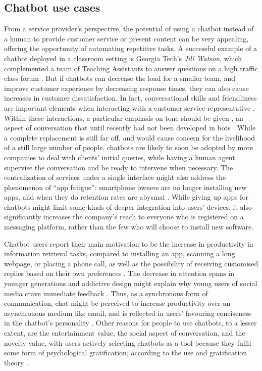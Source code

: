 \subsection{Chatbot use cases}
From a service provider's perspective, the potential of using a chatbot instead of a human to provide customer service or present content can be very appealing, offering the opportunity of automating repetitive tasks. A successful example of a chatbot deployed in a classroom setting is Georgia Tech's \textit{Jill Watson}, which complemented a team of Teaching Assistants to answer questions on a high traffic class forum \cite{Eicher2016}. But if chatbots can decrease the load for a smaller team, and improve customer experience by decreasing response times, they can also cause increases in customer dissatisfaction. In fact, conversational skills and friendliness are important elements when interacting with a customer service representative \cite{Kang2013}. Within these interactions, a particular emphasis on tone should be given \cite{morris1988many}, an aspect of conversation that until recently had not been developed in bots \cite{Hu2018}. While a complete replacement is still far off, and would cause concern for the livelihood of a still large number of people, chatbots are likely to soon be adopted by more companies to deal with clients' initial queries, while having a human agent supervise the conversation and be ready to intervene when necessary. The centralization of services under a single interface might also address the phenomenon of ``app fatigue'': smartphone owners are no longer installing new apps, and when they do retention rates are abysmal \cite{appfatigue}. While giving up apps for chatbots might limit some kinds of deeper integration into users' devices, it also significantly increases the company's reach to everyone who is registered on a messaging platform, rather than the few who will choose to install new software. 

Chatbot users report their main motivation to be the increase in productivity in information retrieval tasks, compared to installing an app, scanning a long webpage, or placing a phone call, as well as the possibility of receiving customised replies based on their own preferences \cite{10.1007/978-3-319-70284-1_30}. The decrease in attention spans in younger generations \cite{Wilmer2017} and addictive design might explain why young users of social media crave immediate feedback \cite{brandtzaeg2016should}. Thus, as a synchronous form of communication, chat might be perceived to increase productivity over an asynchronous medium like email, and is reflected in users' favouring conciseness in the chatbot's personality \cite{10.1007/978-3-319-67744-6_28}. Other reasons for people to use chatbots, to a lesser extent, are the entertainment value, the social aspect of conversation, and the novelty value, with users actively selecting chatbots as a tool because they fulfil some form of psychological gratification, according to the use and gratification theory \cite{10.1007/978-3-319-70284-1_30}.
